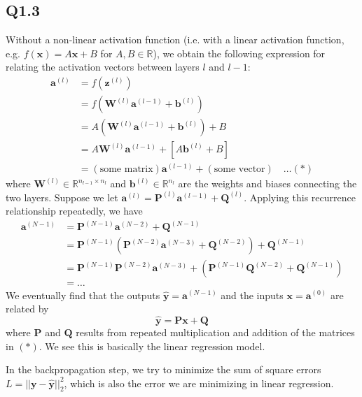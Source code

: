 \documentclass{article} %
\begin{document}
    \subsection*{Q1.3}

    Without a non-linear activation function (i.e. with a linear activation function, e.g. $f(\mathbf{x})=A\mathbf{x}+B$ for $A,B\in\mathbb{R}$), we obtain the following expression for relating the activation vectors between layers $l$ and $l-1$:
    $$\begin{aligned}
    \mathbf{a}^{(l)}&=f(\mathbf{z}^{(l)})\\
    &=f(\mathbf{W}^{(l)}\mathbf{a}^{(l-1)}+\mathbf{b}^{(l)})\\
    &=A(\mathbf{W}^{(l)}\mathbf{a}^{(l-1)}+\mathbf{b}^{(l)})+B\\
    &=A\mathbf{W}^{(l)}\mathbf{a}^{(l-1)}+\left[A\mathbf{b}^{(l)}+B\right]\\
    &=(\text{some matrix})\mathbf{a}^{(l-1)}+(\text{some vector})\hspace{1em} \dots (*)
    \end{aligned}$$
    where $\mathbf{W}^{(l)}\in\mathbb{R}^{n_{l-1}\times n_l}$ and $\mathbf{b}^{(l)}\in\mathbb{R}^{n_l}$ are the weights and biases connecting the two layers. Suppose we let $\mathbf{a}^{(l)}=\mathbf{P}^{(l)}\mathbf{a}^{(l-1)}+\mathbf{Q}^{(l)}$. Applying this recurrence relationship repeatedly, we have
    $$\begin{aligned}
        \mathbf{a}^{(N-1)}&=\mathbf{P}^{(N-1)}\mathbf{a}^{(N-2)}+\mathbf{Q}^{(N-1)}\\
        &=\mathbf{P}^{(N-1)}(\mathbf{P}^{(N-2)}\mathbf{a}^{(N-3)}+\mathbf{Q}^{(N-2)})+\mathbf{Q}^{(N-1)}\\
        &=\mathbf{P}^{(N-1)}\mathbf{P}^{(N-2)}\mathbf{a}^{(N-3)}+\left(\mathbf{P}^{(N-1)}\mathbf{Q}^{(N-2)}+\mathbf{Q}^{(N-1)}\right)\\
        &= \dots
    \end{aligned}$$
    We eventually find that the outputs $\hat{\mathbf{y}}=\mathbf{a}^{(N-1)}$ and the inputs $\mathbf{x}=\mathbf{a}^{(0)}$ are related by
    $$\hat{\mathbf{y}}=\mathbf{Px}+\mathbf{Q}$$
    where $\mathbf{P}$ and $\mathbf{Q}$ results from repeated multiplication and addition of the matrices in $(*)$. We see this is basically the linear regression model.  
    \medskip

    In the backpropagation step, we try to minimize the sum of square errors $L=||\mathbf{y}-\hat{\mathbf{y}}||_2^2$, which is also the error we are minimizing in linear regression.
    \medskip
\end{document}
